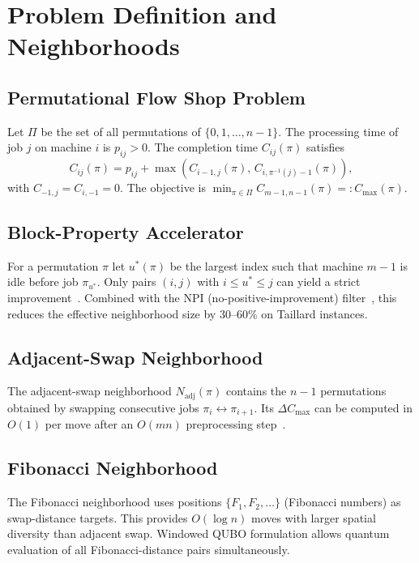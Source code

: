\documentclass[runningheads]{llncs}
\begin{document}
\section{Problem Definition and Neighborhoods}

\subsection{Permutational Flow Shop Problem}

Let $\Pi$ be the set of all permutations of $\{0, 1, \ldots, n-1\}$. The processing time of job $j$ on machine $i$ is $p_{ij} > 0$. The completion time $C_{ij}(\pi)$ satisfies
\[
C_{ij}(\pi) = p_{ij} + \max(C_{i-1,j}(\pi),\, C_{i,\pi^{-1}(j)-1}(\pi)),
\]
with $C_{-1,j} = C_{i,-1} = 0$. The objective is $\min_{\pi \in \Pi} C_{m-1,n-1}(\pi) =: C_{\max}(\pi)$.

\subsection{Block-Property Accelerator}

For a permutation $\pi$ let $u^*(\pi)$ be the largest index such that machine $m-1$ is idle before job $\pi_{u^*}$. Only pairs $(i,j)$ with $i \leq u^* \leq j$ can yield a strict improvement~\cite{smutnicki}. Combined with the NPI (no-positive-improvement) filter~\cite{wodecki04}, this reduces the effective neighborhood size by $30$--$60\%$ on Taillard instances.

\subsection{Adjacent-Swap Neighborhood}

The adjacent-swap neighborhood $N_{\mathrm{adj}}(\pi)$ contains the $n-1$ permutations obtained by swapping consecutive jobs $\pi_i \leftrightarrow \pi_{i+1}$. Its $\Delta C_{\max}$ can be computed in $O(1)$ per move after an $O(mn)$ preprocessing step~\cite{wodecki04}.

\subsection{Fibonacci Neighborhood}

The Fibonacci neighborhood uses positions $\{F_1, F_2, \ldots\}$ (Fibonacci numbers) as swap-distance targets. This provides $O(\log n)$ moves with larger spatial diversity than adjacent swap. Windowed QUBO formulation allows quantum evaluation of all Fibonacci-distance pairs simultaneously.
\end{document}
